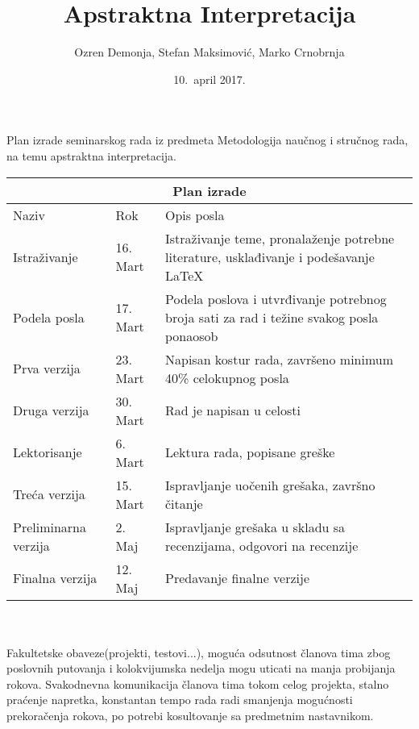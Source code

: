 \documentclass[12pt]{article}
\begin{document}
\title{Apstraktna Interpretacija}
\author{Ozren Demonja, Stefan Maksimović, Marko Crnobrnja}
\date{10.~april 2017.}
\maketitle

Plan izrade seminarskog rada iz predmeta Metodologija naučnog i stručnog rada, na temu apstraktna interpretacija. \\


\setlength{\arrayrulewidth}{0.5mm}
\setlength{\tabcolsep}{12pt}
\renewcommand{\arraystretch}{1.0}


{
\begin{tabular}{ |p{3cm}|p{2cm}|p{4cm}|  }
\hline
\multicolumn{3}{|c|}{Plan izrade} \\
\hline
Naziv &Rok &Opis posla \\
\hline
Istraživanje &16. Mart &Istraživanje teme, pronalaženje potrebne  literature, usklađivanje i podešavanje \LaTeX \\
Podela posla &17. Mart &Podela poslova i utvrđivanje potrebnog broja sati za rad i težine svakog posla ponaosob\\
Prva verzija &23. Mart &Napisan kostur rada, završeno minimum 40\% celokupnog posla \\
Druga verzija &30. Mart &Rad je napisan u celosti \\
Lektorisanje &6. Mart &Lektura rada, popisane greške \\
Treća verzija &15. Mart &Ispravljanje uočenih grešaka, završno čitanje \\
Preliminarna verzija &2. Maj &Ispravljanje grešaka u skladu sa recenzijama, odgovori na recenzije     \\
Finalna verzija &12. Maj &Predavanje finalne verzije     \\

\hline
\end{tabular}
}
\\
\\

Fakultetske obaveze(projekti, testovi...), moguća odsutnost članova tima zbog poslovnih putovanja i kolokvijumska nedelja mogu uticati na manja probijanja rokova.
Svakodnevna komunikacija članova tima tokom celog projekta, stalno praćenje napretka, konstantan tempo rada radi smanjenja mogućnosti prekoračenja rokova, po potrebi kosultovanje sa predmetnim nastavnikom.
\newline
\end{document}
